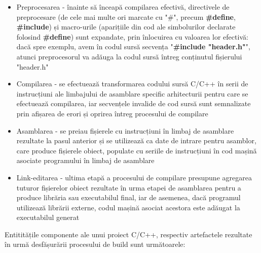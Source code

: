 \begin{itemize}
    \item Preprocesarea - înainte să înceapă compilarea efectivă, directivele de preprocesare
    (de cele mai multe ori marcate cu "\#", precum \textbf{\#define}, \textbf{\#include}) și macro-urile (aparițiile
    din cod ale simbolurilor declarate folosind \textbf{\#define}) sunt expandate, prin înlocuirea cu
    valoarea lor efectivă: dacă spre exemplu, avem în codul sursă secvența "\textbf{\#include "header.h"}", atunci
    preprocesorul va adăuga la codul sursă întreg conținutul fișierului "header.h"
    \item Compilarea - se efectuează transformarea codului sursă C/C++ în serii de instrucțiuni ale limbajului
    de asamblare specific arhitecturii pentru care se efectuează compilarea, iar secvențele invalide de cod sursă
    sunt semnalizate prin afișarea de erori și oprirea întreg procesului de compilare
    \item Asamblarea - se preiau fișierele cu instrucțiuni în limbaj de asamblare rezultate la pasul anterior și 
    se utilizează ca date de intrare pentru asamblor, care produce fișierele obiect, populate cu seriile de instrucțiuni
    în cod mașină asociate programului în limbaj de asamblare
    \item Link-editarea - ultima etapă a procesului de compilare presupune agregarea tuturor fișierelor obiect 
    rezultate în urma etapei de asamblarea pentru a produce librăria sau executabilul final, iar de asemenea,
    dacă programul utilizează librării externe, codul mașină asociat acestora este adăugat la executabilul generat
\end{itemize}

Entititățile componente ale unui proiect C/C++, respectiv artefactele rezultate în urmă desfășurării procesului de 
build sunt următoarele:

